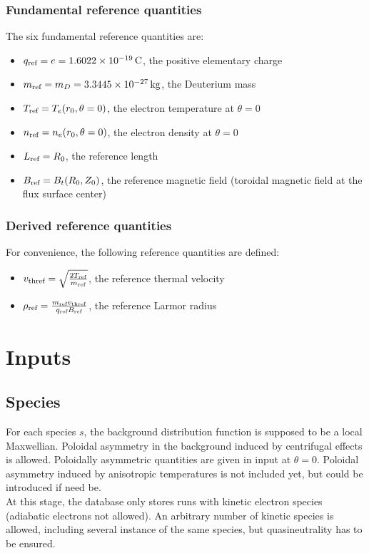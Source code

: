 \documentclass[a4paper]{report}
\begin{document}
\subsection{Fundamental reference quantities}
The six fundamental reference quantities are:
\begin{itemize}
\item $q_{\textrm{ref}}=e=1.6022\times10^{-19}\,\textrm{C}$, the positive elementary charge
\item $m_{\textrm{ref}}=m_D=3.3445\times10^{-27}\,\textrm{kg}$, the Deuterium mass
\item $T_{\textrm{ref}}=T_e(r_0,\theta=0)$, the electron temperature at $\theta=0$
\item $n_{\textrm{ref}}=n_e(r_0,\theta=0)$, the electron density at $\theta=0$
\item $L_{\textrm{ref}}=R_0$, the reference length
\item $B_{\textrm{ref}}=B_t(R_0,Z_0)$, the reference magnetic field (toroidal magnetic field at the flux surface center)
\end{itemize}

\subsection{Derived reference quantities}
For convenience, the following reference quantities are defined:
\begin{itemize}
\item $v_\textrm{thref}=\sqrt{\frac{2T_{\textrm{ref}}}{m_{\textrm{ref}}}}$, the reference thermal velocity
\item $\rho_{\textrm{ref}} = \frac{m_{\textrm{ref}} v_\textrm{thref}}{q_{\textrm{ref}} B_{\textrm{ref}}}$, the reference Larmor radius
\end{itemize}


\chapter{Inputs}
\section{Species}
For each species $s$, the background distribution function is supposed to be a local Maxwellian. Poloidal asymmetry in the background induced by centrifugal effects is allowed. Poloidally asymmetric quantities are given in input at $\theta=0$. Poloidal asymmetry induced by anisotropic temperatures is not included yet, but could be introduced if need be.\\ 
At this stage, the database only stores runs with kinetic electron species (adiabatic electrons not allowed). An arbitrary number of kinetic species is allowed, including several instance of the same species, but quasineutrality has to be ensured.
\end{document}
